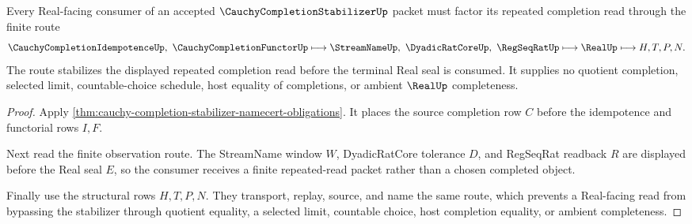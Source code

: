 \begin{theorem}
\label{thm:cauchy-completion-stabilizer-seal-route}
Every Real-facing consumer of an accepted $\CauchyCompletionStabilizerUp$ packet must factor its repeated completion read through the finite route
$$
\CauchyCompletionIdempotenceUp,\ \CauchyCompletionFunctorUp
\longmapsto
\StreamNameUp,\ \DyadicRatCoreUp,\ \RegSeqRatUp
\longmapsto
\RealUp
\longmapsto
H,T,P,N .
$$
The route stabilizes the displayed repeated completion read before the terminal Real seal is consumed. It supplies no quotient completion, selected limit, countable-choice schedule, host equality of completions, or ambient $\RealUp$ completeness.
\end{theorem}
\begin{proof}
Apply \autoref{thm:cauchy-completion-stabilizer-namecert-obligations}. It places the source completion row $C$ before the idempotence and functorial rows $I,F$.

Next read the finite observation route. The StreamName window $W$, DyadicRatCore tolerance $D$, and RegSeqRat readback $R$ are displayed before the Real seal $E$, so the consumer receives a finite repeated-read packet rather than a chosen completed object.

Finally use the structural rows $H,T,P,N$. They transport, replay, source, and name the same route, which prevents a Real-facing read from bypassing the stabilizer through quotient equality, a selected limit, countable choice, host completion equality, or ambient completeness.
\end{proof}


\begin{closurestatus}{\CauchyCompletionStabilizerUp}
  \theoryclosure{\seedClosure}
  \formalstatus{\unformalizedV}
\end{closurestatus}
